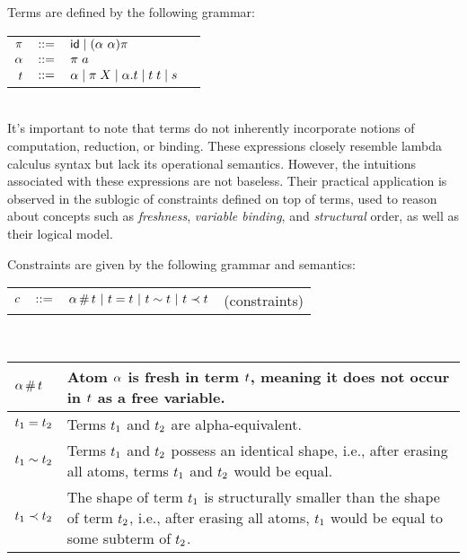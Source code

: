 \documentclass[english, mgr]{iithesis}
\renewcommand{\it}[1]{\textit{#1}}
\begin{document}
Terms are defined by the following grammar:
\\
\begin{tabular}{rclr}
    $\pi$    & $::=$ & $\mathsf{id} \mid (\alpha\ \alpha) \pi$ \\
    $\alpha$ & $::=$ & $\pi \; a$ \\
    $t$    & $::=$ & $\alpha \mid \pi \; X \mid \alpha. t \mid t \; t \mid s$
\end{tabular}
\\

It's important to note that terms do not inherently incorporate notions of computation, reduction, or binding.
These expressions closely resemble lambda calculus syntax but lack its operational semantics.
However, the intuitions associated with these expressions are not baseless.
Their practical application is observed in the sublogic of constraints defined on top of terms,
used to reason about concepts such as \it{freshness}, \it{variable binding}, and \it{structural} order, as well as their logical model.

Constraints are given by the following grammar and semantics:
\\
\begin{tabular}{rclr}
    $c$  & $::=$ & $\alpha \,\#\, t
                   \ |\  t = t
                   \ |\  t \sim t
                   \ |\  t \prec t$
        & (constraints)
\end{tabular}
\\
\begin{tabularx}{\linewidth}{|l|X|}
  \hline
  $\alpha \,\#\, t$ & Atom $\alpha$ is fresh in term $t$, meaning it does not occur in $t$ as a free variable. \\
  \hline
  $t_1 = t_2$ & Terms $t_1$ and $t_2$ are alpha-equivalent. \\
  \hline
  $t_1 \sim t_2$ & Terms $t_1$ and $t_2$ possess an identical shape, i.e., after erasing all atoms, terms $t_1$ and $t_2$ would be equal. \\
  \hline
  $t_1 \prec t_2$ & The shape of term $t_1$ is structurally smaller than the shape of term $t_2$, i.e., after erasing all atoms, $t_1$ would be equal to some subterm of $t_2$. \\
  \hline
\end{tabularx}
\end{document}
